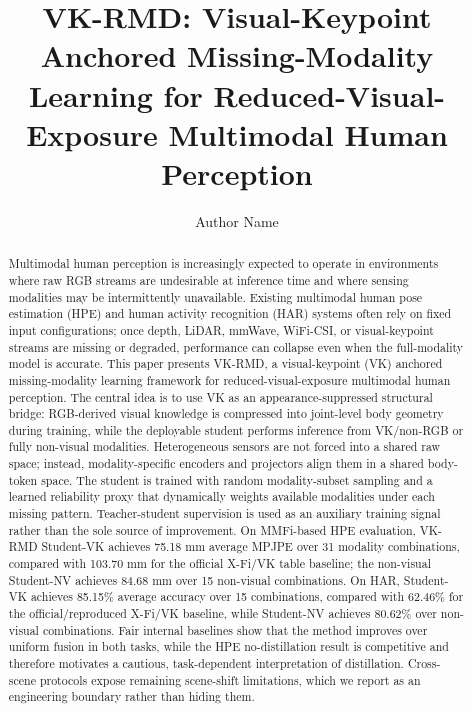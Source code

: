 \documentclass[preprint,12pt]{elsarticle}
\newcommand{\method}{VK-RMD}
\newcommand{\mpjpe}{MPJPE}
\begin{document}
\begin{frontmatter}


\title{\method: Visual-Keypoint Anchored Missing-Modality Learning for Reduced-Visual-Exposure Multimodal Human Perception}

\author[1]{Author Name}
\address[1]{School of Computer Science and Technology, Dalian University of Technology, Dalian, China}

\begin{abstract}
Multimodal human perception is increasingly expected to operate in environments where raw RGB streams are undesirable at inference time and where sensing modalities may be intermittently unavailable. Existing multimodal human pose estimation (HPE) and human activity recognition (HAR) systems often rely on fixed input configurations; once depth, LiDAR, mmWave, WiFi-CSI, or visual-keypoint streams are missing or degraded, performance can collapse even when the full-modality model is accurate. This paper presents \method, a visual-keypoint (VK) anchored missing-modality learning framework for reduced-visual-exposure multimodal human perception. The central idea is to use VK as an appearance-suppressed structural bridge: RGB-derived visual knowledge is compressed into joint-level body geometry during training, while the deployable student performs inference from VK/non-RGB or fully non-visual modalities. Heterogeneous sensors are not forced into a shared raw space; instead, modality-specific encoders and projectors align them in a shared body-token space. The student is trained with random modality-subset sampling and a learned reliability proxy that dynamically weights available modalities under each missing pattern. Teacher-student supervision is used as an auxiliary training signal rather than the sole source of improvement. On MMFi-based HPE evaluation, \method{} Student-VK achieves 75.18 mm average \mpjpe{} over 31 modality combinations, compared with 103.70 mm for the official X-Fi/VK table baseline; the non-visual Student-NV achieves 84.68 mm over 15 non-visual combinations. On HAR, Student-VK achieves 85.15\% average accuracy over 15 combinations, compared with 62.46\% for the official/reproduced X-Fi/VK baseline, while Student-NV achieves 80.62\% over non-visual combinations. Fair internal baselines show that the method improves over uniform fusion in both tasks, while the HPE no-distillation result is competitive and therefore motivates a cautious, task-dependent interpretation of distillation. Cross-scene protocols expose remaining scene-shift limitations, which we report as an engineering boundary rather than hiding them.
\end{abstract}


\end{frontmatter}
\end{document}
